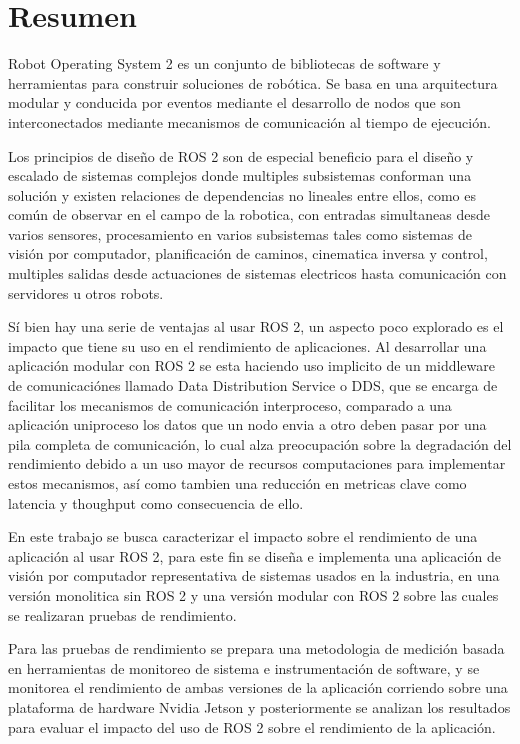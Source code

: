 \chapter*{Resumen}
Robot Operating System 2 es un conjunto de bibliotecas de software y herramientas para construir soluciones de robótica.
Se basa en una arquitectura modular y conducida por eventos mediante el desarrollo de nodos 
que son interconectados mediante mecanismos de comunicación al tiempo de ejecución.

Los principios de diseño de ROS 2 son de especial beneficio para el diseño y escalado de sistemas complejos
donde multiples subsistemas conforman una solución y existen relaciones de dependencias no lineales entre ellos,
como es común de observar en el campo de la robotica, con entradas simultaneas desde varios sensores,
procesamiento en varios subsistemas tales como sistemas de visión por computador, planificación de caminos, cinematica inversa y control, 
multiples salidas desde actuaciones de sistemas electricos hasta comunicación con servidores u otros robots.

Sí bien hay una serie de ventajas al usar ROS 2, un aspecto poco explorado es el
impacto que tiene su uso en el rendimiento de aplicaciones. Al desarrollar una aplicación
modular con ROS 2 se esta haciendo uso implicito de un middleware de comunicaciónes llamado Data Distribution Service
o DDS, que se encarga de facilitar los mecanismos de comunicación interproceso, comparado a una aplicación uniproceso
los datos que un nodo envia a otro deben pasar por una pila completa de comunicación, lo cual alza 
preocupación sobre la degradación del rendimiento debido a un uso mayor de recursos computaciones para
implementar estos mecanismos, así como tambien una reducción en metricas clave como latencia y thoughput como consecuencia de ello.

En este trabajo se busca caracterizar el impacto sobre el rendimiento de una aplicación al usar ROS 2, 
para este fin se diseña e implementa una aplicación de visión por computador representativa de sistemas
usados en la industria, en una versión monolitica sin ROS 2 y una versión modular con ROS 2 sobre las cuales se 
realizaran pruebas de rendimiento.

Para las pruebas de rendimiento se prepara una metodologia de medición basada en herramientas de monitoreo de sistema e instrumentación de software,
y se monitorea el rendimiento de ambas versiones de la aplicación corriendo sobre una plataforma de hardware Nvidia Jetson y
posteriormente se analizan los resultados para evaluar el impacto del uso de ROS 2 sobre el rendimiento de la aplicación.

